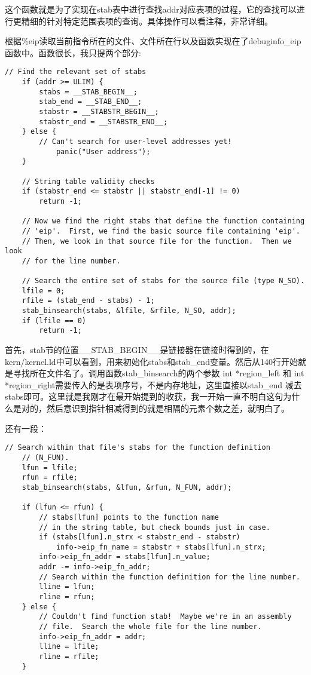 \documentclass{article}
\newcommand{\funcname}[1]{{\ttfamily \small #1}}
\begin{document}
\begin{CJK*}{UTF8}{gkai}
这个函数就是为了实现在stab表中进行查找addr对应表项的过程，它的查找可以进行更精细的针对特定范围表项的查询。具体操作可以看注释，非常详细。

根据\%eip读取当前指令所在的文件、文件所在行以及函数实现在了\funcname{debuginfo\_eip}函数中。函数很长，我只提两个部分:

\begin{lstlisting}[style=ccode, firstnumber=119, title={\scriptsize \ttfamily \bfseries kern/kdebug.c}]
	// Find the relevant set of stabs
	if (addr >= ULIM) {
		stabs = __STAB_BEGIN__;
		stab_end = __STAB_END__;
		stabstr = __STABSTR_BEGIN__;
		stabstr_end = __STABSTR_END__;
	} else {
		// Can't search for user-level addresses yet!
  	        panic("User address");
	}

	// String table validity checks
	if (stabstr_end <= stabstr || stabstr_end[-1] != 0)
		return -1;

	// Now we find the right stabs that define the function containing
	// 'eip'.  First, we find the basic source file containing 'eip'.
	// Then, we look in that source file for the function.  Then we look
	// for the line number.
	
	// Search the entire set of stabs for the source file (type N_SO).
	lfile = 0;
	rfile = (stab_end - stabs) - 1;
	stab_binsearch(stabs, &lfile, &rfile, N_SO, addr);
	if (lfile == 0)
		return -1;
\end{lstlisting}

首先，stab节的位置\_\_STAB\_BEGIN\_\_是链接器在链接时得到的，在kern/kernel.ld中可以看到，用来初始化stabs和stab\_end变量。然后从140行开始就是寻找所在文件名了。调用函数stab\_binsearch的两个参数 int *region\_left 和 int *region\_right需要传入的是表项序号，不是内存地址，这里直接以stab\_end 减去 stabs即可。这里就是我刚才在最开始提到的收获，我一开始一直不明白这句为什么是对的，然后意识到指针相减得到的就是相隔的元素个数之差，就明白了。

还有一段：

\begin{lstlisting}[style=ccode, firstnumber=146, title={\scriptsize \ttfamily \bfseries kern/kdebug.c}]
	// Search within that file's stabs for the function definition
	// (N_FUN).
	lfun = lfile;
	rfun = rfile;
	stab_binsearch(stabs, &lfun, &rfun, N_FUN, addr);

	if (lfun <= rfun) {
		// stabs[lfun] points to the function name
		// in the string table, but check bounds just in case.
		if (stabs[lfun].n_strx < stabstr_end - stabstr)
			info->eip_fn_name = stabstr + stabs[lfun].n_strx;
		info->eip_fn_addr = stabs[lfun].n_value;
		addr -= info->eip_fn_addr;
		// Search within the function definition for the line number.
		lline = lfun;
		rline = rfun;
	} else {
		// Couldn't find function stab!  Maybe we're in an assembly
		// file.  Search the whole file for the line number.
		info->eip_fn_addr = addr;
		lline = lfile;
		rline = rfile;
	}
\end{lstlisting}


\end{CJK*}
\end{document}
